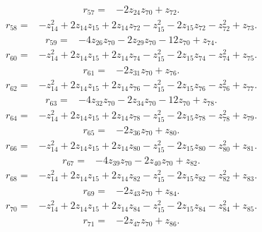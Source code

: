 \begin{align*}
 r_{57}={}&-2z_{24}z_{70}+z_{72} .
\end{align*}
\begin{align*}
 r_{58}={}&-z_{14}^{2}+2z_{14}z_{15}+2z_{14}z_{72}-z_{15}^{2}-2z_{15}z_{72}-z_{72}^{2}+z_{73} .
\end{align*}
\begin{align*}
 r_{59}={}&-4z_{26}z_{70}-2z_{29}z_{70}-12z_{70}+z_{74} .
\end{align*}
\begin{align*}
 r_{60}={}&-z_{14}^{2}+2z_{14}z_{15}+2z_{14}z_{74}-z_{15}^{2}-2z_{15}z_{74}-z_{74}^{2}+z_{75} .
\end{align*}
\begin{align*}
 r_{61}={}&-2z_{31}z_{70}+z_{76} .
\end{align*}
\begin{align*}
 r_{62}={}&-z_{14}^{2}+2z_{14}z_{15}+2z_{14}z_{76}-z_{15}^{2}-2z_{15}z_{76}-z_{76}^{2}+z_{77} .
\end{align*}
\begin{align*}
 r_{63}={}&-4z_{32}z_{70}-2z_{34}z_{70}-12z_{70}+z_{78} .
\end{align*}
\begin{align*}
 r_{64}={}&-z_{14}^{2}+2z_{14}z_{15}+2z_{14}z_{78}-z_{15}^{2}-2z_{15}z_{78}-z_{78}^{2}+z_{79} .
\end{align*}
\begin{align*}
 r_{65}={}&-2z_{36}z_{70}+z_{80} .
\end{align*}
\begin{align*}
 r_{66}={}&-z_{14}^{2}+2z_{14}z_{15}+2z_{14}z_{80}-z_{15}^{2}-2z_{15}z_{80}-z_{80}^{2}+z_{81} .
\end{align*}
\begin{align*}
 r_{67}={}&-4z_{39}z_{70}-2z_{40}z_{70}+z_{82} .
\end{align*}
\begin{align*}
 r_{68}={}&-z_{14}^{2}+2z_{14}z_{15}+2z_{14}z_{82}-z_{15}^{2}-2z_{15}z_{82}-z_{82}^{2}+z_{83} .
\end{align*}
\begin{align*}
 r_{69}={}&-2z_{43}z_{70}+z_{84} .
\end{align*}
\begin{align*}
 r_{70}={}&-z_{14}^{2}+2z_{14}z_{15}+2z_{14}z_{84}-z_{15}^{2}-2z_{15}z_{84}-z_{84}^{2}+z_{85} .
\end{align*}
\begin{align*}
 r_{71}={}&-2z_{47}z_{70}+z_{86} .
\end{align*}
